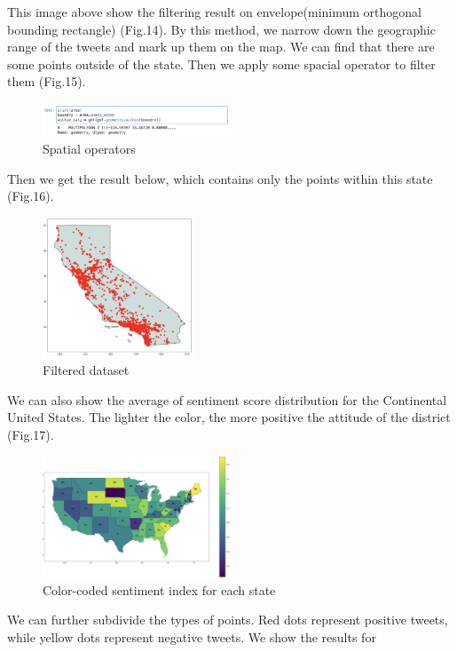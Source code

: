This image above show the filtering result on envelope(minimum orthogonal
bounding rectangle) (Fig.14). By this method, we narrow down the geographic
range of the tweets and mark up them on the map. We can find that there are
some points outside of the state. Then we apply some spacial operator to
filter them (Fig.15).
\begin{figure}[h]
    \centering
    \includegraphics[width=0.5\textwidth]{imgs/sp_operator.png}
    \caption{\label{fig:Research process}Spatial operators}
\end{figure}
Then we get the result below, which contains only the points within this
state (Fig.16).
\begin{figure}[h]
    \centering
    \includegraphics[width=0.4\textwidth]{imgs/ca1_result.png}
    \caption{\label{fig:Research process}Filtered dataset}
\end{figure}
We can also show the average of sentiment score distribution for the
Continental United States. The lighter the color, the more positive the
attitude of the district (Fig.17).
\begin{figure}[h]
    \centering
    \includegraphics[width=0.5\textwidth]{imgs/USA_info.png}
    \caption{\label{fig:Research process}Color-coded sentiment index for each state}
\end{figure}
We can further subdivide the types of points. Red dots represent positive
tweets, while yellow dots represent negative tweets. We show the results for
